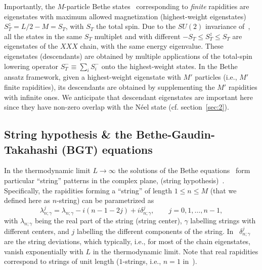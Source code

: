 \documentclass[11pt]{iopart}
\begin{document}
Importantly, the $M$-particle Bethe states~ corresponding to 
{\it finite} rapidities are eigenstates with maximum allowed magnetization 
(highest-weight eigenstates) $S_T^z=L/2-M=S_T$, with $S_T$ the total spin. 
Due to the $SU(2)$ invariance of~, all the states in the same 
$S_T$ multiplet and with different $-S_T\le S_T^z\le S_T$ are eigenstates of the 
$XXX$ chain, with the same energy eigenvalue. These eigenstates 
(descendants) are obtained by multiple applications of the total-spin lowering 
operator $S_T^-\equiv\sum_iS_i^-$ onto the highest-weight states. In the Bethe 
ansatz framework, given a highest-weight eigenstate with $M'$ particles (i.e., 
$M'$ finite rapidities), its descendants are obtained by supplementing the $M'$ 
rapidities with infinite ones. We anticipate that descendant eigenstates 
are important here since they have non-zero overlap with the N\'eel state (cf. 
section~\ref{sec:2}). 
 
\subsection{String hypothesis \& the Bethe-Gaudin-Takahashi (BGT) equations}
\label{sec:1.3}

In the thermodynamic limit $L\to\infty$ the solutions of the Bethe equations~ 
form particular ``string'' patterns in the complex plane, (string hypothesis)~\cite{
bethe-1931,taka-book}. Specifically, the rapidities forming a ``string'' of length $1
\le n\le M$ (that we defined here as $n$-string) can be parametrized as 
%
\begin{equation}
\label{str-hyp}
\lambda^{j}_{n;\gamma}=\lambda_{n;\gamma}-i(n-1-2j)+i\delta_{n;\gamma}^j,\qquad 
j=0,1,\dots, n-1, 
\end{equation}
%
with $\lambda_{n;\gamma}$ being the real part of the string (string center), 
$\gamma$ labelling strings with different centers, and $j$ labelling the different 
components of the string. In~ $\delta_{n;\gamma}^j$ are the string 
deviations, which typically, i.e., for most of the chain eigenstates, vanish 
exponentially with $L$ in the thermodynamic limit. Note that real rapidities 
correspond to strings of unit length ($1$-strings, i.e., $n=1$ in~). 
\end{document}
